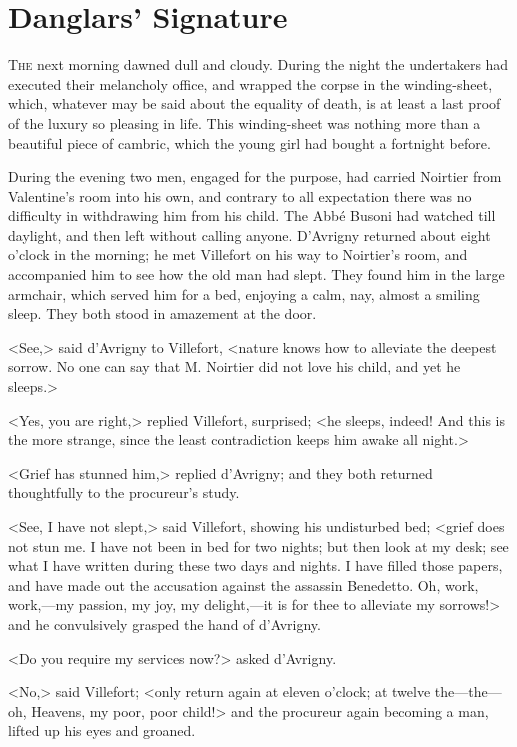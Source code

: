 \chapter{Danglars' Signature}

 \lettrine{T}{he} next morning dawned dull and cloudy. During the night the undertakers had executed their melancholy office, and wrapped the corpse in the winding-sheet, which, whatever may be said about the equality of death, is at least a last proof of the luxury so pleasing in life. This winding-sheet was nothing more than a beautiful piece of cambric, which the young girl had bought a fortnight before. 

 During the evening two men, engaged for the purpose, had carried Noirtier from Valentine's room into his own, and contrary to all expectation there was no difficulty in withdrawing him from his child. The Abbé Busoni had watched till daylight, and then left without calling anyone. D'Avrigny returned about eight o'clock in the morning; he met Villefort on his way to Noirtier's room, and accompanied him to see how the old man had slept. They found him in the large armchair, which served him for a bed, enjoying a calm, nay, almost a smiling sleep. They both stood in amazement at the door. 

 <See,> said d'Avrigny to Villefort, <nature knows how to alleviate the deepest sorrow. No one can say that M. Noirtier did not love his child, and yet he sleeps.> 

 <Yes, you are right,> replied Villefort, surprised; <he sleeps, indeed! And this is the more strange, since the least contradiction keeps him awake all night.> 

 <Grief has stunned him,> replied d'Avrigny; and they both returned thoughtfully to the procureur's study. 

 <See, I have not slept,> said Villefort, showing his undisturbed bed; <grief does not stun me. I have not been in bed for two nights; but then look at my desk; see what I have written during these two days and nights. I have filled those papers, and have made out the accusation against the assassin Benedetto. Oh, work, work,—my passion, my joy, my delight,—it is for thee to alleviate my sorrows!> and he convulsively grasped the hand of d'Avrigny. 

 <Do you require my services now?> asked d'Avrigny. 

 <No,> said Villefort; <only return again at eleven o'clock; at twelve the—the—oh, Heavens, my poor, poor child!> and the procureur again becoming a man, lifted up his eyes and groaned. 

